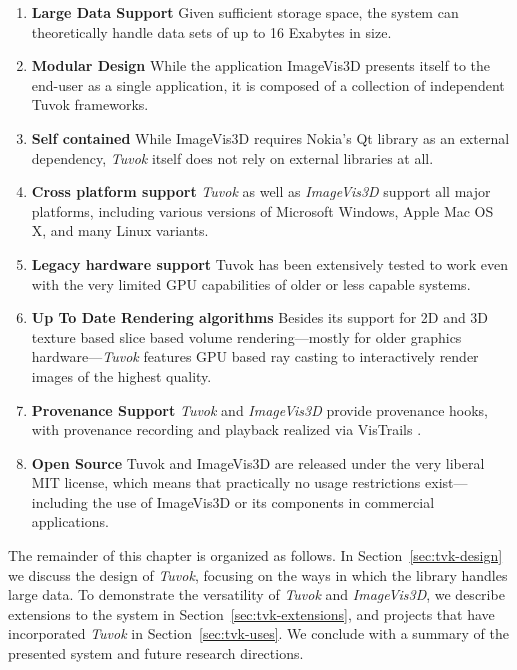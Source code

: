 \begin{enumerate}

\item \textbf{Large Data Support}
Given sufficient storage space, the system can theoretically
handle data sets of up to 16 Exabytes in size.
\item \textbf{Modular Design}
While the application ImageVis3D presents itself to the
end-user as a single application, it is composed of a
collection of independent Tuvok frameworks.
\item \textbf{Self contained}
While ImageVis3D requires Nokia's Qt \todo{[Nok09]} library
as an external dependency, \textit{Tuvok} itself does not rely on
external libraries at all.
\item \textbf{Cross platform support}
\textit{Tuvok} as well as \textit{ImageVis3D} support all major platforms,
including various versions of Microsoft Windows, Apple
Mac OS X, and many Linux variants.
\item \textbf{Legacy hardware support}
Tuvok has been extensively tested to work even with the
very limited GPU capabilities of older or less capable
systems.
\item \textbf{Up To Date Rendering algorithms}
Besides its support for 2D and 3D texture based slice
based volume rendering---mostly for older graphics
hardware---\textit{Tuvok} features GPU based ray casting to
interactively render images of the highest quality.
\item \textbf{Provenance Support}
\textit{Tuvok} and \textit{ImageVis3D} provide provenance hooks, with
provenance recording and playback realized via VisTrails
\todo{[BCS 05]}.
\item \textbf{Open Source}
Tuvok and ImageVis3D are released under the very liberal
MIT license, which means that practically no usage
restrictions exist---including the use of ImageVis3D or its
components in commercial applications.

\end{enumerate}

The remainder of this chapter is organized as follows. In
Section~\ref{sec:tvk-design} we discuss the design of \textit{Tuvok},
focusing on the ways in which the library handles large data. To
demonstrate
the versatility of \textit{Tuvok} and \textit{ImageVis3D}, we describe
extensions
to the system in Section~\ref{sec:tvk-extensions}, and projects that
have
incorporated \textit{Tuvok} in Section~\ref{sec:tvk-uses}. We conclude
with a summary of the presented system and future research directions.

